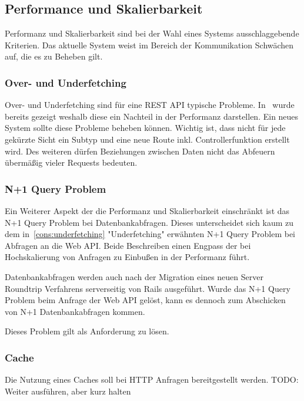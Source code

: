 
\subsection{Performance und Skalierbarkeit}
Performanz und Skalierbarkeit sind bei der Wahl eines Systems ausschlaggebende Kriterien. Das aktuelle System weist im Bereich der Kommunikation Schwächen auf, die es zu Beheben gilt.

\subsubsection{Over- und Underfetching}
Over- und Underfetching sind für eine REST API typische Probleme.
In~ wurde bereits gezeigt weshalb diese ein Nachteil in der Performanz darstellen.
Ein neues System sollte diese Probleme beheben können.
Wichtig ist, dass nicht für jede gekürzte Sicht ein Subtyp und eine neue Route inkl. Controllerfunktion erstellt wird. Des weiteren dürfen Beziehungen zwischen Daten nicht das Abfeuern übermäßig vieler Requests bedeuten.

\subsubsection{N+1 Query Problem}
Ein Weiterer Aspekt der die Performanz und Skalierbarkeit einschränkt ist das N+1 Query Problem bei Datenbankabfragen. Dieses unterscheidet sich kaum zu dem in~\ref{cons:underfetching} "Underfetching" erwähnten N+1 Query Problem bei Abfragen an die Web API. Beide Beschreiben einen Engpass der bei Hochskalierung von Anfragen zu Einbußen in der Performanz führt. 

Datenbankabfragen werden auch nach der Migration eines neuen Server Roundtrip Verfahrens serverseitig von Rails ausgeführt. Wurde das N+1 Query Problem beim Anfrage der Web API gelöst, kann es dennoch zum Abschicken von N+1 Datenbankabfragen kommen.

Dieses Problem gilt als Anforderung zu lösen.

\subsubsection{Cache}
Die Nutzung eines Caches soll bei HTTP Anfragen bereitgestellt werden.
TODO: Weiter ausführen, aber kurz halten


